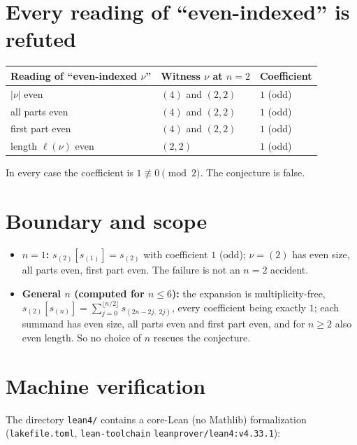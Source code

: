 \documentclass[11pt]{article}
\newcommand{\s}[1]{s_{#1}}
\theoremstyle{plain}
\begin{document}
\section{Every reading of ``even-indexed'' is refuted}\label{sec:readings}

\begin{center}
\begin{tabular}{lll}
\toprule
Reading of ``even-indexed $\nu$'' & Witness $\nu$ at $n=2$ & Coefficient\\
\midrule
$|\nu|$ even          & $(4)$ and $(2,2)$ & $1$ (odd)\\
all parts even        & $(4)$ and $(2,2)$ & $1$ (odd)\\
first part even       & $(4)$ and $(2,2)$ & $1$ (odd)\\
length $\ell(\nu)$ even & $(2,2)$         & $1$ (odd)\\
\bottomrule
\end{tabular}
\end{center}

In every case the coefficient is $1 \not\equiv 0 \pmod 2$.  The conjecture is
false.

\section{Boundary and scope}

\begin{itemize}
\item \textbf{$n=1$:} $\s{(2)}[\s{(1)}] = \s{(2)}$ with coefficient $1$
(odd); $\nu=(2)$ has even size, all parts even, first part even.  The failure
is not an $n=2$ accident.
\item \textbf{General $n$ (computed for $n \le 6$):} the expansion is
multiplicity-free,
$\s{(2)}[\s{(n)}] = \sum_{j=0}^{\lfloor n/2\rfloor} \s{(2n-2j,\; 2j)}$,
every coefficient being exactly $1$; each summand has even size, all parts
even and first part even, and for $n\ge 2$ also even length.  So no choice of
$n$ rescues the conjecture.
\end{itemize}

\section{Machine verification}

The directory \texttt{lean4/} contains a core-Lean (no Mathlib) formalization
(\texttt{lakefile.toml}, \texttt{lean-toolchain} \texttt{leanprover/lean4:v4.33.1}):
\end{document}
